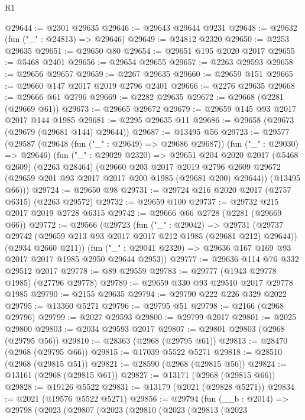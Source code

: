 \begin{lexlean}{R1}
\begin{coremodule}
@29644 := @2301 @29635
@29646 := @29643 @29644 @9231
@29648 := @29632 (fun ("_" : @24813) => @29646)
@29649 := @24812 @2320
@29650 := @2253 @29635
@29651 := @29650 @80
@29654 := @29651 @195 @2020 @2017
@29655 := @5468 @2401
@29656 := @29654 @29655
@29657 := @2263 @29593
@29658 := @29656 @29657
@29659 := @2267 @29635
@29660 := @29659 @151
@29665 := @29660 @147 @2017 @2019 @2796 @2401
@29666 := @2276 @29635
@29668 := @29666 @61 @2796
@29669 := @2282 @29635
@29672 := @29668 (@2281 (@29669 @61))
@29673 := @29665 @29672
@29679 := @29659 @145 @93 @2017 @2017 @144 @1985
@29681 := @2295 @29635 @11
@29686 := @29658 (@29673 (@29679 (@29681 @144) @29644))
@29687 := @13495 @56
@29723 := @29577
    (@29587
      (@29648 (fun ("_" : @29649) => @29686 @29687))
      (fun ("_" : @29030) => @29646)
      (fun ("_" : @29029 @2320) =>
      @29651
        @204
        @2020
        @2017
        (@5468 @2609)
        (@2263 @28464)
        (@29660
          @203
          @2017
          @2019
          @2796
          @2609
          @29672
          (@29659 @201 @93 @2017 @2017 @200 @1985 (@29681 @200) @29644))
        (@13495 @66)))
@29724 := @29650 @98
@29731 := @29724 @216 @2020 @2017 (@2757 @6315) (@2263 @29572)
@29732 := @29659 @100
@29737 := @29732 @215 @2017 @2019 @2728 @6315
@29742 := @29666 @66 @2728 (@2281 (@29669 @66))
@29772 := @29566
    (@29723
      (fun ("_" : @29042) =>
      @29731
        (@29737 @29742 (@29659 @213 @93 @2017 @2017 @212 @1985 (@29681 @212) @29644))
        (@2934 @2660 @211))
      (fun ("_" : @29041 @2320) => @29636 @167 @169 @93 @2017 @2017 @1985 @2950 @29644 @2953))
@29777 := @29636 @114 @76 @332 @29512 @2017
@29778 := @89 @29559
@29783 := @29777 (@1943 @29778 @1985) (@27796 @29778)
@29789 := @29659 @330 @93 @29510 @2017 @29778 @1985
@29790 := @2155 @29635
@29794 := @29790 @222 @226 @329 @2022
@29795 := @13360 @5271
@29796 := @29795 @51
@29798 := @2166 (@2968 @29796)
@29799 := @2027 @29593
@29800 := @29799 @2017
@29801 := @2025 @29800
@29803 := @2034 @29593 @2017
@29807 := @29801 @29803 (@2968 (@29795 @56))
@29810 := @28363 (@2968 (@29795 @61))
@29813 := @28470 (@2968 (@29795 @66))
@29815 := @17039 @5522 @5271
@29818 := @28510 (@2968 (@29815 @51))
@29821 := @28590 (@2968 (@29815 @56))
@29824 := @13161 (@2968 (@29815 @61))
@29827 := @13171 (@2968 (@29815 @66))
@29828 := @19126 @5522
@29831 := @13179 (@2021 (@29828 @5271))
@29834 := @2021 (@19576 @5522 @5271)
@29856 := @29794
    (fun (__b : @2014) =>
    @29798
      (@2023
        (@29807
          (@2023
            (@29810
              (@2023
                (@29813
                  (@2023

\end{coremodule}
\end{lexlean}
